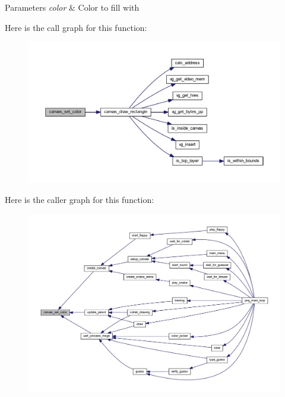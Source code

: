 \begin{DoxyParams}{Parameters}
{\em color} & Color to fill with \\
\hline
\end{DoxyParams}
Here is the call graph for this function\+:\nopagebreak
\begin{figure}[H]
\begin{center}
\leavevmode
\includegraphics[width=350pt]{group__canvas_ga82c276340112469fe11a819ade81ead2_cgraph}
\end{center}
\end{figure}
Here is the caller graph for this function\+:\nopagebreak
\begin{figure}[H]
\begin{center}
\leavevmode
\includegraphics[width=350pt]{group__canvas_ga82c276340112469fe11a819ade81ead2_icgraph}
\end{center}
\end{figure}
\mbox{\label{group__canvas_ga042599a460db7bc889fdf51cb56ae732}} 
